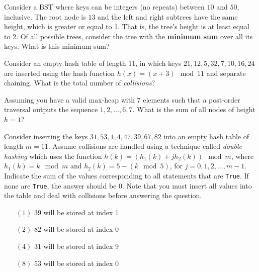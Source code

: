 \documentclass[12pt,addpoints]{exam}
\begin{document}
\begin{questions}
    

\question[7] Consider a BST where keys can be integers (no repeats) between $10$ and $50$, inclusive.  The root node is $13$ and the left and right subtrees have the same height, which is greater or equal to 1.  That is, the tree's height is at least equal to 2.  Of all possible trees, consider the tree with the {\bf minimum sum} over all its keys.  What is this minimum sum?    
\answerline

\question[7] Consider an empty hash table of length $11$, in which keys $21,12,5,32,7,10,16,24$ are inserted using the hash function $h(x)=(x+3) \mod 11$ and separate chaining.  What is the total number of {\it collisions}?
\answerline

\question[7] Assuming you have a valid max-heap with $7$ elements such that a post-order traversal outputs the sequence $1,2,\dots,6,7$.  What is the sum of all nodes of height $h=1$?
\answerline

\question[7] Consider inserting the keys $31, 53, 1, 4, 47, 39, 67, 82$ into an empty hash table of length $m=11$.  Assume collisions are handled using a technique called {\it double hashing} which uses the function $h(k)=(h_1(k)+j h_2(k))\mod m$, where $h_1(k)=k\mod m$ and $h_2(k)=5-(k\mod 5)$, for $j=0,1,2,\dots,m-1$.  Indicate the sum of the values corresponding to all statements that are \verb|True|.  If none are \verb|True|, the answer should be $0$.  Note that you must insert all values into the table and deal with collisions before answering the question.
\begin{itemize}	\item[$(1)$] $39$ will be stored at index 1	\item[$(2)$] $82$ will be stored at index 0	\item[$(4)$] $31$ will be stored at index 9	\item[$(8)$] $53$ will be stored at index 0\end{itemize}\answerline

\end{questions}
\end{document}

